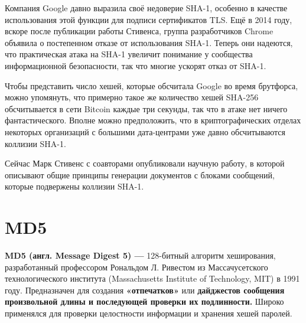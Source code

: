 \documentclass[a4paper,14pt]{report}
\begin{document}
Компания Google давно выразила своё недоверие SHA-1, особенно в качестве использования этой функции для подписи сертификатов TLS. Ещё в 2014 году, вскоре после публикации работы Стивенса, группа разработчиков Chrome объявила о постепенном отказе от использования SHA-1. Теперь они надеются, что практическая атака на SHA-1 увеличит понимание у сообщества информационной безопасности, так что многие ускорят отказ от SHA-1.

Чтобы представить число хешей, которые обсчитала Google во время брутфорса, можно упомянуть, что примерно такое же количество хешей SHA-256 обсчитывается в сети Bitcoin каждые три секунды, так что в атаке нет ничего фантастического. Вполне можно предположить, что в криптографических отделах некоторых организаций с большими дата-центрами уже давно обсчитываются коллизии SHA-1.

Сейчас Марк Стивенс с соавторами опубликовали научную работу, в которой описывают общие принципы генерации документов с блоками сообщений, которые подвержены коллизии SHA-1.

\begin{figure}[h]
\label{fig:image}
\end{figure}




\section{MD5}
\textbf{MD5 (англ. Message Digest 5) —} 128-битный алгоритм хеширования, разработанный профессором Рональдом Л. Ривестом из Массачусетского технологического института (Massachusetts Institute of Technology, MIT) в 1991 году. Предназначен для создания \textbf{«отпечатков»} или \textbf{дайджестов сообщения произвольной длины и последующей проверки их подлинности.} Широко применялся для проверки целостности информации и хранения хешей паролей.
\end{document}

